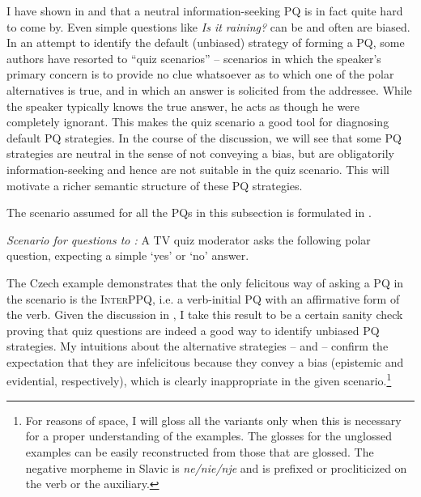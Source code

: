 \documentclass[output=paper,colorlinks,citecolor=brown]{langscibook}
\begin{document}
I have shown in  and  that a neutral information-seeking PQ is in fact quite hard to come by. Even simple questions like \textit{Is it raining?} can be and often are biased. In an attempt to identify the default (unbiased) strategy of forming a PQ, some authors \citep{Farkas.Roelofsen2017,AnderBois2019} have resorted to ``quiz scenarios'' -- scenarios in which the speaker's primary concern is to provide no clue whatsoever as to which one of the polar alternatives is true, and in which an answer is solicited from the addressee. While the speaker typically knows the true answer, he acts as though he were completely ignorant. This makes the quiz scenario a good tool for diagnosing default PQ strategies. In the course of the discussion, we will see that some PQ strategies are neutral in the sense of not conveying a bias, but are obligatorily information-seeking and hence are not suitable in the quiz scenario. This will motivate a richer semantic structure of these PQ strategies.

The scenario assumed for all the PQs in this subsection is formulated in .

\ea \textit{Scenario for questions  to :} A TV quiz moderator asks the following polar question, expecting a simple `yes' or `no' answer.\label{sim:scen:default}
\z

\noindent The Czech example  demonstrates that the only felicitous way of asking a PQ in the scenario  is the \textsc{InterPPQ}, i.e. a verb-initial PQ with an affirmative form of the verb. Given the discussion in , I take this result to be a certain sanity check proving that quiz questions are indeed a good way to identify unbiased PQ strategies. My intuitions about the alternative strategies --  and  -- confirm the expectation that they are infelicitous because they convey a bias (epistemic and evidential, respectively), which is clearly inappropriate in the given scenario.\footnote{For reasons of space, I will gloss all the variants only when this is necessary for a proper understanding of the examples. The glosses for the unglossed examples can be easily reconstructed from those that are glossed. The negative morpheme in Slavic is \textit{ne/nie/nje} and is prefixed or procliticized on the verb or the auxiliary.}

\ea \label{sim:ex:just-cz}
\z\z
\end{document}
